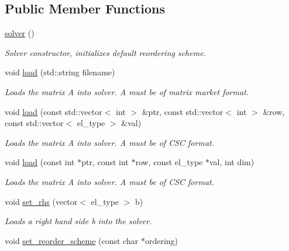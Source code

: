 \subsection*{Public Member Functions}
\begin{DoxyCompactItemize}
\item 
\hyperlink{classsymildl_1_1solver_a25b48b7bbe9da67bae450bfa96f4d82a}{solver} ()\hypertarget{classsymildl_1_1solver_a25b48b7bbe9da67bae450bfa96f4d82a}{}\label{classsymildl_1_1solver_a25b48b7bbe9da67bae450bfa96f4d82a}

\begin{DoxyCompactList}\small\item\em Solver constructor, initializes default reordering scheme. \end{DoxyCompactList}\item 
void \hyperlink{classsymildl_1_1solver_ab955b7afafeb6d1e3bd6773a51532320}{load} (std\+::string filename)
\begin{DoxyCompactList}\small\item\em Loads the matrix A into solver. A must be of matrix market format. \end{DoxyCompactList}\item 
void \hyperlink{classsymildl_1_1solver_aa314c6dbbdfbf92260ab6efb476f1329}{load} (const std\+::vector$<$ int $>$ \&ptr, const std\+::vector$<$ int $>$ \&row, const std\+::vector$<$ el\+\_\+type $>$ \&val)\hypertarget{classsymildl_1_1solver_aa314c6dbbdfbf92260ab6efb476f1329}{}\label{classsymildl_1_1solver_aa314c6dbbdfbf92260ab6efb476f1329}

\begin{DoxyCompactList}\small\item\em Loads the matrix A into solver. A must be of C\+SC format. \end{DoxyCompactList}\item 
void \hyperlink{classsymildl_1_1solver_a65c920496d613ab5d7c4b84337044638}{load} (const int $\ast$ptr, const int $\ast$row, const el\+\_\+type $\ast$val, int dim)\hypertarget{classsymildl_1_1solver_a65c920496d613ab5d7c4b84337044638}{}\label{classsymildl_1_1solver_a65c920496d613ab5d7c4b84337044638}

\begin{DoxyCompactList}\small\item\em Loads the matrix A into solver. A must be of C\+SC format. \end{DoxyCompactList}\item 
void \hyperlink{classsymildl_1_1solver_aa9d29c78909f5a0c0c1c079f15f5b7cf}{set\+\_\+rhs} (vector$<$ el\+\_\+type $>$ b)
\begin{DoxyCompactList}\small\item\em Loads a right hand side b into the solver. \end{DoxyCompactList}\item 
void \hyperlink{classsymildl_1_1solver_a930b0602ccb731a48120599b90f675a6}{set\+\_\+reorder\+\_\+scheme} (const char $\ast$ordering)\hypertarget{classsymildl_1_1solver_a930b0602ccb731a48120599b90f675a6}{}\label{classsymildl_1_1solver_a930b0602ccb731a48120599b90f675a6}


\end{DoxyCompactItemize}
